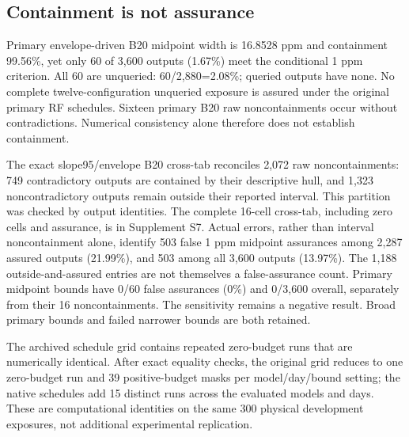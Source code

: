 \subsection{Containment is not assurance}\label{sec:boundresults}
Primary envelope-driven B20 midpoint width is 16.8528 ppm and containment 99.56\%, yet only 60 of 3,600 outputs (1.67\%) meet the conditional 1 ppm criterion. All 60 are unqueried: 60/2,880=2.08\%; queried outputs have none. No complete twelve-configuration unqueried exposure is assured under the original primary RF schedules. Sixteen primary B20 raw noncontainments occur without contradictions. Numerical consistency alone therefore does not establish containment.

The exact slope95/envelope B20 cross-tab reconciles 2,072 raw noncontainments: 749 contradictory outputs are contained by their descriptive hull, and 1,323 noncontradictory outputs remain outside their reported interval. This partition was checked by output identities. The complete 16-cell cross-tab, including zero cells and assurance, is in Supplement S7. Actual errors, rather than interval noncontainment alone, identify 503 false 1 ppm midpoint assurances among 2,287 assured outputs (21.99\%), and 503 among all 3,600 outputs (13.97\%). The 1,188 outside-and-assured entries are not themselves a false-assurance count. Primary midpoint bounds have 0/60 false assurances (0\%) and 0/3,600 overall, separately from their 16 noncontainments. The sensitivity remains a negative result. Broad primary bounds and failed narrower bounds are both retained.

The archived schedule grid contains repeated zero-budget runs that are numerically identical. After exact equality checks, the original grid reduces to one zero-budget run and 39 positive-budget masks per model/day/bound setting; the native schedules add 15 distinct runs across the evaluated models and days. These are computational identities on the same 300 physical development exposures, not additional experimental replication.
